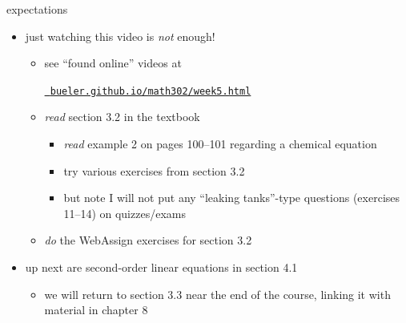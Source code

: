 \documentclass{beamer}
\begin{document}
\begin{frame}{expectations}

\begin{itemize}
\item just watching this video is \emph{not} enough!
     \begin{itemize}
     \item see ``found online'' videos at

     \centerline{\href{https://bueler.github.io/math302/week5.html}{\tt \color{cyan} bueler.github.io/math302/week5.html}}
     \item \emph{read} section 3.2 in the textbook
         \begin{itemize}
         \item \emph{read} example 2 on pages 100--101 regarding a chemical equation
         \item try various exercises from section 3.2
         \item but note I will not put any ``leaking tanks''-type questions (exercises 11--14) on quizzes/exams
         \end{itemize}
     \item \emph{do} the WebAssign exercises for section 3.2
     \end{itemize}

\bigskip
\item up next are second-order linear equations in section 4.1
    \begin{itemize}
    \item we will return to section 3.3 near the end of the course, linking it with material in chapter 8
    \end{itemize}
\end{itemize}
\end{frame}
\end{document}
